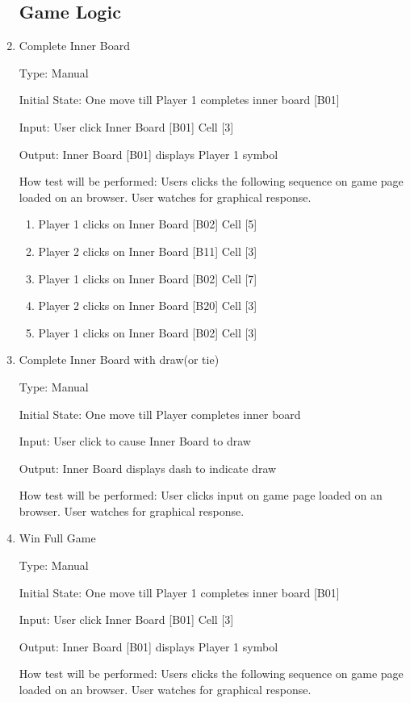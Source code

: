 \documentclass[12pt, titlepage]{article}
\begin{document}
\begin{enumerate}
\subsection{Game Logic}

\item{Complete Inner Board\\}

Type: Manual
					
Initial State: One move till Player 1 completes inner board [B01]
					
Input: User click Inner Board [B01] Cell [3] 
					
Output:  Inner Board [B01] displays Player 1 symbol
					
How test will be performed: Users clicks the following sequence on game page loaded on an browser. User watches for graphical response.
\begin{enumerate}
	\item Player 1 clicks on Inner Board [B02] Cell [5]
	\item Player 2 clicks on Inner Board [B11] Cell [3]
	\item Player 1 clicks on Inner Board [B02] Cell [7]
	\item Player 2 clicks on Inner Board [B20] Cell [3]
	\item Player 1 clicks on Inner Board [B02] Cell [3]
\end{enumerate}

\item{Complete Inner Board with draw(or tie) \\}

Type: Manual
					
Initial State: One move till Player completes inner board
					
Input: User click to cause Inner Board to draw 
					
Output:  Inner Board displays dash to indicate draw
					
How test will be performed: User clicks input on game page loaded on an browser. User watches for graphical response.

\item{Win Full Game\\}

Type: Manual
					
Initial State: One move till Player 1 completes inner board [B01]
					
Input: User click Inner Board [B01] Cell [3] 
					
Output:  Inner Board [B01] displays Player 1 symbol
					
How test will be performed: Users clicks the following sequence on game page loaded on an browser. User watches for graphical response.


\end{enumerate}
	
\end{document}
